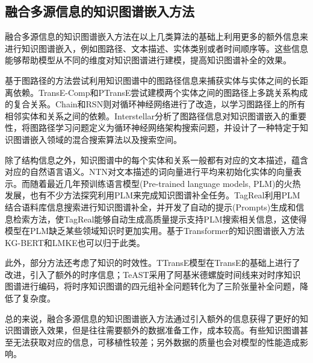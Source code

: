 \subsection{融合多源信息的知识图谱嵌入方法}

融合多源信息的知识图谱嵌入方法在以上几类算法的基础上利用更多的额外信息来进行知识图谱嵌入，例如图路径、文本描述、实体类别或者时间顺序等。这些信息能够帮助模型从不同的维度对知识图谱进行建模，提高知识图谱补全的效果。

基于图路径的方法尝试利用知识图谱中的图路径信息来捕获实体与实体之间的长距离依赖。TransE-Comp和PTransE尝试建模两个实体之间的图路径上多跳关系构成的复合关系。Chain和RSN则对循环神经网络进行了改造，以学习图路径上的所有相邻实体和关系之间的依赖。Interstellar分析了图路径信息对知识图谱嵌入的重要性，将图路径学习问题定义为循环神经网络架构搜索问题，并设计了一种特定于知识图谱嵌入领域的混合搜索算法以及搜索空间。

除了结构信息之外，知识图谱中的每个实体和关系一般都有对应的文本描述，蕴含对应的自然语言语义。NTN对文本描述的词向量进行平均来初始化实体的向量表示。而随着最近几年预训练语言模型(Pre-trained language models, PLM)的火热发展，也有不少方法探究利用PLM来完成知识图谱补全任务。TagReal利用PLM结合语料库信息搜索进行知识图谱补全，并开发了自动的提示(Prompts)生成和信息检索方法，使TagReal能够自动生成高质量提示支持PLM搜索相关信息，这使得模型在PLM缺乏某些领域知识时更加实用。基于Transformer的知识图谱嵌入方法KG-BERT和LMKE也可以归于此类。

此外，部分方法还考虑了知识的时效性。TTransE模型在TransE的基础上进行了改进，引入了额外的时序信息；TeAST采用了阿基米德螺旋时间线来对时序知识图谱进行编码，将时序知识图谱的四元组补全问题转化为了三阶张量补全问题，降低了复杂度。

总的来说，融合多源信息的知识图谱嵌入方法通过引入额外的信息获得了更好的知识图谱嵌入效果，但是往往需要额外的数据准备工作，成本较高。有些知识图谱甚至无法获取对应的信息，可移植性较差；另外数据的质量也会对模型的性能造成影响。

